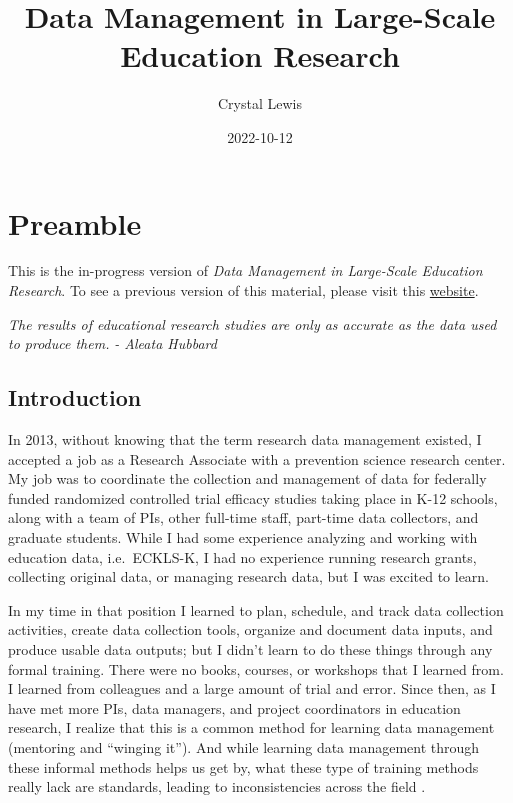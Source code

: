 \documentclass[
]{book}
\title{Data Management in Large-Scale Education Research}
\author{Crystal Lewis}
\date{2022-10-12}
\begin{document}
\maketitle

{
\setcounter{tocdepth}{1}
\tableofcontents
}
\hypertarget{preamble}{%
\chapter{Preamble}\label{preamble}}

This is the in-progress version of \emph{Data Management in Large-Scale Education Research}. To see a previous version of this material, please visit this \href{https://cghlewis.github.io/mpsi-data-training/}{website}.

\emph{The results of educational research studies are only as accurate as the data used to produce them.}
\emph{- Aleata Hubbard} \autocite{hubbard_data_2017}

\hypertarget{introduction}{%
\section{Introduction}\label{introduction}}

In 2013, without knowing that the term research data management existed, I accepted a job as a Research Associate with a prevention science research center. My job was to coordinate the collection and management of data for federally funded randomized controlled trial efficacy studies taking place in K-12 schools, along with a team of PIs, other full-time staff, part-time data collectors, and graduate students. While I had some experience analyzing and working with education data, i.e.~ECKLS-K, I had no experience running research grants, collecting original data, or managing research data, but I was excited to learn.

In my time in that position I learned to plan, schedule, and track data collection activities, create data collection tools, organize and document data inputs, and produce usable data outputs; but I didn't learn to do these things through any formal training. There were no books, courses, or workshops that I learned from. I learned from colleagues and a large amount of trial and error. Since then, as I have met more PIs, data managers, and project coordinators in education research, I realize that this is a common method for learning data management (mentoring and ``winging it''). And while learning data management through these informal methods helps us get by, what these type of training methods really lack are standards, leading to inconsistencies across the field \autocite{borghi_promoting_2022}.
\end{document}
